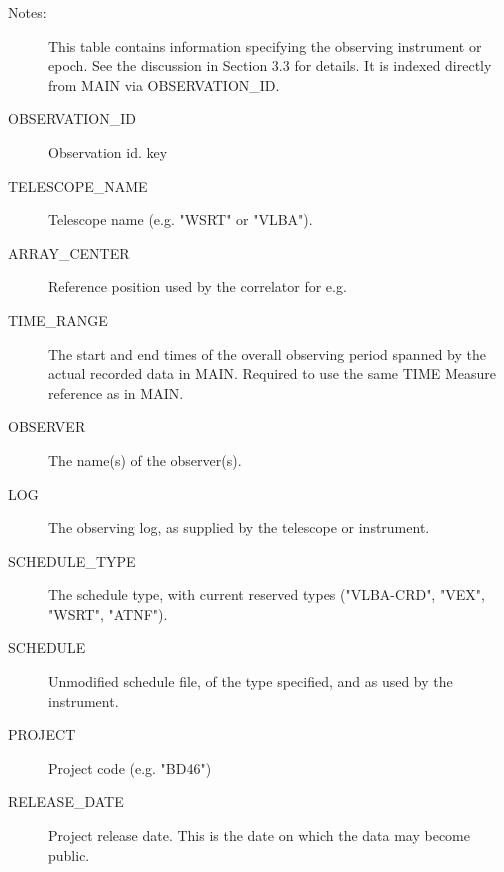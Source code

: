 \documentclass{article}
\begin{document}
\begin{description}

\item[Notes:] This table contains information specifying the observing
instrument or epoch. See the discussion in Section 3.3 for details. It
is indexed directly from MAIN via OBSERVATION\_ID.
\item[OBSERVATION\_ID] Observation id. key
\item[TELESCOPE\_NAME] Telescope name (e.g. "WSRT" or "VLBA").
\item[ARRAY\_CENTER] Reference position used by the correlator for e.g.
\item[TIME\_RANGE] The start and end times of the overall observing
period spanned by the actual recorded data in MAIN. Required to use
the same TIME Measure reference as in MAIN.

\item[OBSERVER] The name(s) of the observer(s).

\item[LOG] The observing log, as supplied by the telescope or instrument.

\item[SCHEDULE\_TYPE] The schedule type, with current reserved types
("VLBA-CRD", "VEX", "WSRT", "ATNF").

\item[SCHEDULE] Unmodified schedule file, of the type specified, and
as used by the instrument.

\item[PROJECT] Project code (e.g. "BD46")

\item[RELEASE\_DATE] Project release date. This is the date on which
the data may become public.
\end{description}
\end{document}
